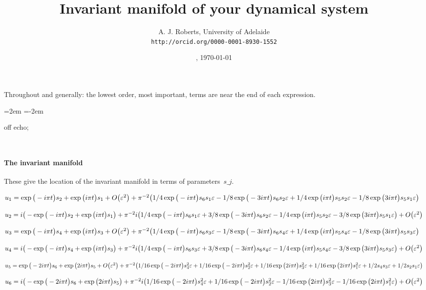 \documentclass[11pt,a5paper]{article}
\title{Invariant manifold of your dynamical system}
\author{A. J. Roberts, University of Adelaide\\
\texttt{http://orcid.org/0000-0001-8930-1552}}
\date{\now, \today}
\begin{document}
\maketitle
Throughout and generally: the lowest order, most
important, terms are near the end of each expression.
\par\leftskip=2em  \parindent=-2em


off echo;

\(
\)
\paragraph{The invariant manifold}
These give the location of the invariant manifold in
terms of parameters~\(s\_ j\).
\(
\)\par
\(u_{1}=\exp \big(-i \pi  t\big) s_{2}+\exp \big(i \pi  t\big) s_{1}+O
\big(\varepsilon ^{2}\big)+\pi ^{-2} \big(1/4 \exp \big(-i \pi  t\big) s
_{6} s_{1} \varepsilon-1/8 \exp \big(-3 i \pi  t\big) s_{6} s_{2} \varepsilon+1/4 \exp
 \big(i \pi  t\big) s_{5} s_{2} \varepsilon-1/8 \exp \big(3 i \pi  t\big) s_{5}
 s_{1} \varepsilon\big)
\)\par
\(u_{2}=i \big(-\exp \big(-i \pi  t\big) s_{2}+\exp \big(i \pi  t\big) s_{
1}\big)+\pi ^{-2} i \big(1/4 \exp \big(-i \pi  t\big) s_{6} s_{1} \varepsilon+3
/8 \exp \big(-3 i \pi  t\big) s_{6} s_{2} \varepsilon-1/4 \exp \big(i \pi  t
\big) s_{5} s_{2} \varepsilon-3/8 \exp \big(3 i \pi  t\big) s_{5} s_{1} \varepsilon
\big)+O\big(\varepsilon ^{2}\big)
\)\par
\(u_{3}=\exp \big(-i \pi  t\big) s_{4}+\exp \big(i \pi  t\big) s_{3}+O
\big(\varepsilon ^{2}\big)+\pi ^{-2} \big(1/4 \exp \big(-i \pi  t\big) s
_{6} s_{3} \varepsilon-1/8 \exp \big(-3 i \pi  t\big) s_{6} s_{4} \varepsilon+1/4 \exp
 \big(i \pi  t\big) s_{5} s_{4} \varepsilon-1/8 \exp \big(3 i \pi  t\big) s_{5}
 s_{3} \varepsilon\big)
\)\par
\(u_{4}=i \big(-\exp \big(-i \pi  t\big) s_{4}+\exp \big(i \pi  t\big) s_{
3}\big)+\pi ^{-2} i \big(1/4 \exp \big(-i \pi  t\big) s_{6} s_{3} \varepsilon+3
/8 \exp \big(-3 i \pi  t\big) s_{6} s_{4} \varepsilon-1/4 \exp \big(i \pi  t
\big) s_{5} s_{4} \varepsilon-3/8 \exp \big(3 i \pi  t\big) s_{5} s_{3} \varepsilon
\big)+O\big(\varepsilon ^{2}\big)
\)\par
\(u_{5}=\exp \big(-2 i \pi  t\big) s_{6}+\exp \big(2 i \pi  t\big) s_{5}+O
\big(\varepsilon ^{2}\big)+\pi ^{-2} \big(1/16 \exp \big(-2 i \pi  t
\big) s_{4}^{2} \varepsilon+1/16 \exp \big(-2 i \pi  t\big) s_{2}^{2} \varepsilon+1/16
 \exp \big(2 i \pi  t\big) s_{3}^{2} \varepsilon+1/16 \exp \big(2 i \pi  t\big)
 s_{1}^{2} \varepsilon+1/2 s_{4} s_{3} \varepsilon+1/2 s_{2} s_{1} \varepsilon\big)
\)\par
\(u_{6}=i \big(-\exp \big(-2 i \pi  t\big) s_{6}+\exp \big(2 i \pi  t\big)
 s_{5}\big)+\pi ^{-2} i \big(1/16 \exp \big(-2 i \pi  t\big) s_{4}^{2} 
\varepsilon+1/16 \exp \big(-2 i \pi  t\big) s_{2}^{2} \varepsilon-1/16 \exp \big(2 i 
\pi  t\big) s_{3}^{2} \varepsilon-1/16 \exp \big(2 i \pi  t\big) s_{1}^{2} \varepsilon
\big)+O\big(\varepsilon ^{2}\big)
\)\par
\(
\)
\end{document}
